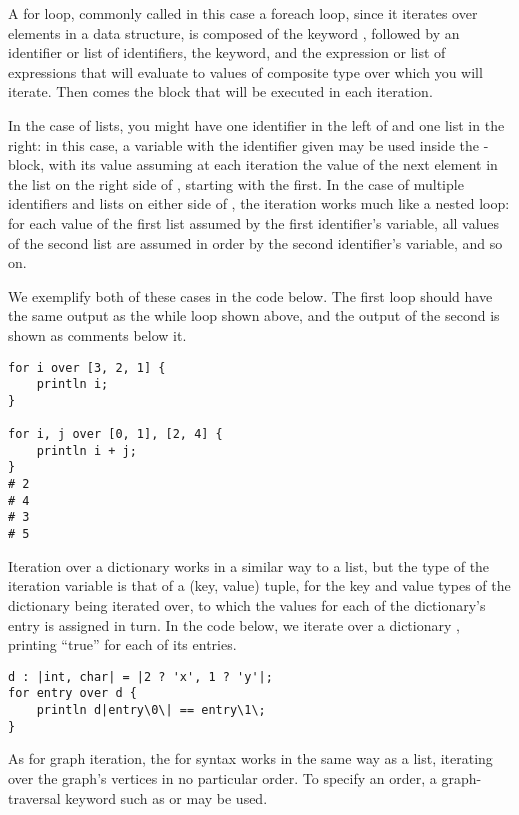 A for loop, commonly called in this case a foreach loop, since it iterates over elements in a data structure, is composed of the keyword , followed by an identifier or list of identifiers, the  keyword, and the expression or list of expressions that will evaluate to values of composite type over which you will iterate. Then comes the block that will be executed in each iteration.

In the case of lists, you might have one identifier in the left of  and one list in the right: in this case, a variable with the identifier given may be used inside the -block, with its value assuming at each iteration the value of the next element in the list on the right side of , starting with the first. In the case of multiple identifiers and lists on either side of , the iteration works much like a nested loop: for each value of the first list assumed by the first identifier's variable, all values of the second list are assumed in order by the second identifier's variable, and so on.

We exemplify both of these cases in the code below. The first loop should have the same output as the while loop shown above, and the output of the second is shown as comments below it.
\begin{lstlisting}[language=Gryph]
for i over [3, 2, 1] {
	println i;
}

for i, j over [0, 1], [2, 4] {
	println i + j;
}
# 2 
# 4 
# 3 
# 5 
\end{lstlisting}

Iteration over a dictionary works in a similar way to a list, but the type of the iteration variable is that of a (key, value) tuple, for the key and value types of the dictionary being iterated over, to which the values for each of the dictionary's entry is assigned in turn. In the code below, we iterate over a dictionary , printing ``true'' for each of its entries.

\begin{lstlisting}[language=Gryph]
d : |int, char| = |2 ? 'x', 1 ? 'y'|;
for entry over d {
	println d|entry\0\| == entry\1\;
}
\end{lstlisting}

As for graph iteration, the for syntax works in the same way as a list, iterating over the graph's vertices in no particular order. To specify an order, a graph-traversal keyword such as  or  may be used.

